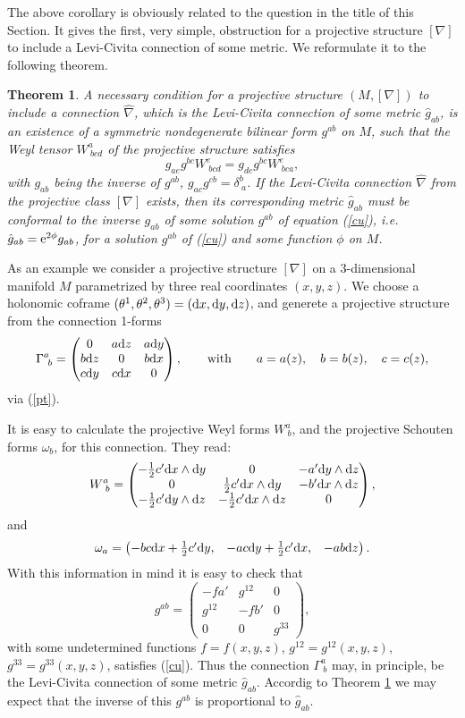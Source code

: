 \documentclass[letterpaper]{amsart}
\newtheorem{theorem}{Theorem}[section]
\theoremstyle{definition}
\theoremstyle{remark}
\newcommand{\be}{\begin{equation}}
\newcommand{\ee}{\end{equation}}
\newcommand{\g}{\gamma}
\newcommand{\om}{\omega}
\newcommand{\dz}{\wedge}
\newcommand{\der}{{\rm d}}
\newcommand{\bma}{\begin{pmatrix}}
\newcommand{\ema}{\end{pmatrix}}
\begin{document}
The above corollary is obviously related to the question in the title
of this Section. It gives the first, very simple, obstruction for a
projective structure $[\nabla]$ to include a Levi-Civita connection of
some metric. We reformulate it to the following theorem.
\begin{theorem}\label{so1}
A necessary condition for a projective structure $(M,[\nabla])$ to
include a connection $\hat{\nabla}$, which is the Levi-Civita
connection of some metric $\hat{g}_{ab}$, is an existence of a symmetric
nondegenerate bilinear form $g^{ab}$ on $M$, such that the Weyl tensor
$W^a_{~bcd}$ of the projective structure satisfies
\be
g_{ae}g^{bc}W^e_{~bcd}=
g_{de}g^{bc}W^e_{~bca},\label{cu}\ee
with $g_{ab}$ being the inverse of $g^{ab}$,
$g_{ac}g^{cb}=\delta^b_{~a}$. If the 
Levi-Civita connection  $\hat{\nabla}$  from the projective class
$[\nabla]$ exists, then its corresponding metric $\hat{g}_{ab}$ must be 
\emph{conformal} to the inverse $g_{ab}$ of some solution $g^{ab}$ of equation (\ref{cu}), i.e. 
$\hat{g}_{ab}={\rm e}^{2\phi}g_{ab}$, for a solution $g^{ab}$ of (\ref{cu})
and some function $\phi$ on $M$.      
\end{theorem} 
As an example we consider a projective structure $[\nabla]$ on a 3-dimensional
manifold $M$ parametrized by three real coordinates $(x,y,z)$. We choose a
holonomic coframe $(\theta^1,\theta^2,\theta^3)=(\der x,\der y,\der
z)$, and generete a projective structure from the
connection 1-forms 
\be
\Gamma^a_{~b}=\bma 0&a\der z&a\der y\\
b\der z&0 &b\der x\\
c\der y&c\der x&0\ema ,\quad\quad{\rm with}\quad\quad a=a(z),\quad
b=b(z),\quad c=c(z),\label{exc1}
\ee
via (\ref{pt}).

It is easy to calculate the projective Weyl forms
$W^a_{~b}$, and the projective Schouten forms $\om_b$, for this
connection. They read:
$$W^a_{~b} =\bma -\tfrac12 c'\der x\dz\der y&0&-a'\der y\dz\der z\\
0&\tfrac12 c'\der x\dz\der y&-b'\der x\dz\der z\\
-\tfrac12 c'\der y\dz\der z&-\tfrac12 c'\der x\dz\der z&0
\ema,$$
and
$$\omega_a=\bma -bc\der x+\tfrac12 c'\der y,&-ac \der y+\tfrac12 c'\der
x,&-ab\der z\ema.$$
With this information in mind it is easy to check that 
\be
g^{ab}=\bma-f a'&g^{12}&0\\g^{12}&-f b'&0\\0&0&g^{33}
\ema,\label{exce}\ee
with some undetermined functions $f=f(x,y,z)$,
$g^{12}=g^{12}(x,y,z)$, $g^{33}=g^{33}(x,y,z)$, satisfies (\ref{cu}). Thus the connection $\Gamma^a_{~b}$ may, in
principle, be the Levi-Civita connection of some metric $\hat{g}_{ab}$. Accordig to
Theorem \ref{so1} we may expect that the inverse of this $g^{ab}$ is proportional to $\hat{g}_{ab}$. 
\end{document}
